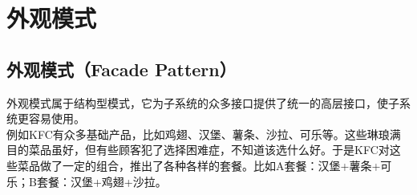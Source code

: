 \newpage

\section{外观模式}

\subsection{外观模式（Facade Pattern）}

外观模式属于结构型模式，它为子系统的众多接口提供了统一的高层接口，使子系统更容易使用。\\

例如KFC有众多基础产品，比如鸡翅、汉堡、薯条、沙拉、可乐等。这些琳琅满目的菜品虽好，但有些顾客犯了选择困难症，不知道该选什么好。于是KFC对这些菜品做了一定的组合，推出了各种各样的套餐。比如A套餐：汉堡+薯条+可乐；B套餐：汉堡+鸡翅+沙拉。\\

\\

